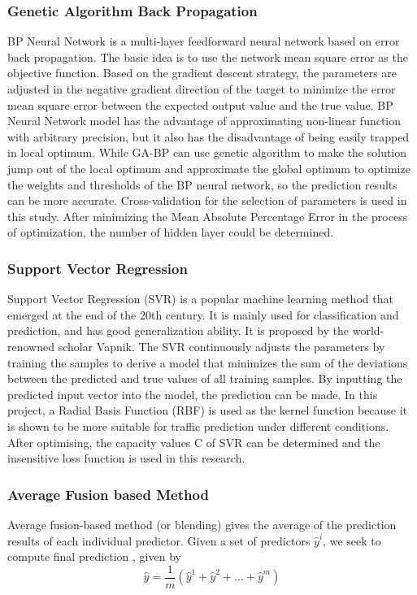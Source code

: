 \documentclass[sigconf]{acmart}
\begin{document}
  \subsubsection{Genetic Algorithm Back Propagation}
  BP Neural Network is a multi-layer feedforward neural network based on error back propagation\cite{chauvin2013backpropagation}.
  The basic idea is to use the network mean square error as the objective function. Based on the gradient descent strategy,
  the parameters are adjusted in the negative gradient direction of the target to minimize the error mean square error between the expected output value and the true value. BP Neural Network model has the advantage of approximating non-linear function with arbitrary precision, but it also has the disadvantage of being easily trapped in local optimum. 
  While GA-BP can use genetic algorithm to make the solution jump out of the local optimum and approximate the global optimum to optimize the weights and thresholds of the BP neural network, so the prediction results can be more accurate.
  Cross-validation for the selection of parameters is used in this study. After minimizing the Mean Absolute Percentage Error in the process of optimization, the number of hidden layer could be determined.
  \subsubsection{Support Vector Regression}
  Support Vector Regression (SVR) is a popular machine learning method that emerged at the end of the 20th century.
  It is mainly used for classification and prediction, and has good generalization ability.
  It is proposed by the world-renowned scholar Vapnik\cite{vapnik2013nature}. The SVR continuously
  adjusts the parameters by training the samples to derive a model that minimizes the sum
  of the deviations between the predicted and true values of all training samples.
  By inputting the predicted input vector into the model, the prediction can be made.
  In this project, a Radial Basis Function (RBF) is used as the kernel function because it is shown to be more suitable for traffic prediction under different conditions\cite{guo2017influence}.
  After optimising, the capacity values C of SVR can be determined and the insensitive loss function is used in this research.
  \subsubsection{Average Fusion based Method}
  Average fusion-based method (or blending) gives the average of the prediction results of each individual predictor. Given a set of predictors $\hat{y}^i$, we seek to compute final prediction , given by
  \begin{equation}
    \hat{y}=\frac{1}{m}\left(\hat{y}^{1}+\hat{y}^{2}+\ldots+\hat{y}^{m}\right)
  \end{equation}
\end{document}

